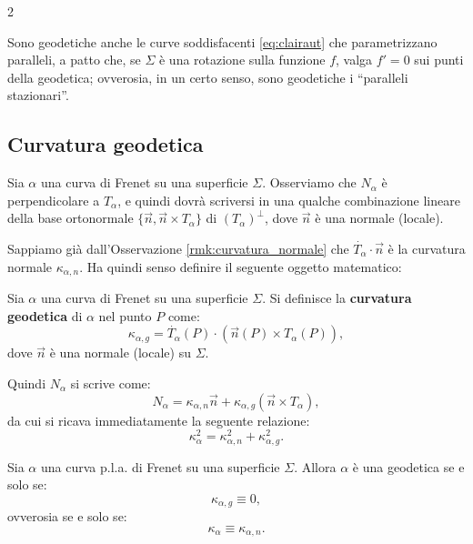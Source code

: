 \begin{multicols*}{2}
    \begin{remark}
        Sono geodetiche anche le curve soddisfacenti \eqref{eq:clairaut} che parametrizzano paralleli, a patto
        che, se $\Sigma$ è una rotazione sulla funzione $f$, valga $f' = 0$ sui punti
        della geodetica; ovverosia, in un certo senso, sono geodetiche i ``paralleli stazionari''.
    \end{remark}

    \subsection{Curvatura geodetica}

    \begin{remark}
        Sia $\alpha$ una curva di Frenet su una superficie $\Sigma$.
        Osserviamo che $N_\alpha$ è perpendicolare a $T_\alpha$, e
        quindi dovrà scriversi in una qualche combinazione lineare
        della base ortonormale $\{\vec{n}, \vec{n} \times T_\alpha\}$
        di $(T_\alpha)^\perp$,
        dove $\vec{n}$ è una normale (locale). \smallskip

        Sappiamo già dall'Osservazione \ref{rmk:curvatura_normale} che
        $\dot{T_\alpha} \cdot \vec{n}$ è la curvatura normale
        $\kappa_{\alpha, n}$. Ha quindi senso definire il seguente
        oggetto matematico:
    \end{remark}

    \begin{definition}
        Sia $\alpha$ una curva di Frenet su una superficie $\Sigma$.
        Si definisce la \textbf{curvatura geodetica} di $\alpha$
        nel punto $P$ come:
        \[
            \boxed{\kappa_{\alpha, g} = \dot{T_\alpha}(P) \cdot (\vec{n}(P) \times T_\alpha(P)),}
        \]
        dove $\vec{n}$ è una normale (locale) su $\Sigma$.
    \end{definition}

    \begin{remark}
        Quindi $N_\alpha$ si scrive come:
        \[
            N_\alpha = \kappa_{\alpha, n} \vec{n} + \kappa_{\alpha, g} (\vec{n} \times T_\alpha),
        \]
        da cui si ricava immediatamente la seguente relazione:
        \[
            \boxed{\kappa_\alpha^2 = \kappa_{\alpha, n}^2 + \kappa_{\alpha, g}^2.}
        \]
    \end{remark}

    \begin{proposition}
        Sia $\alpha$ una curva p.l.a. di Frenet su una superficie $\Sigma$. Allora
        $\alpha$ è una geodetica se e solo se:
        \[ \boxed{\kappa_{\alpha, g} \equiv 0,} \]
        ovverosia se e solo se:
        \[ \boxed{\kappa_{\alpha} \equiv \kappa_{\alpha, n}.} \]
    \end{proposition}


\end{multicols*}
